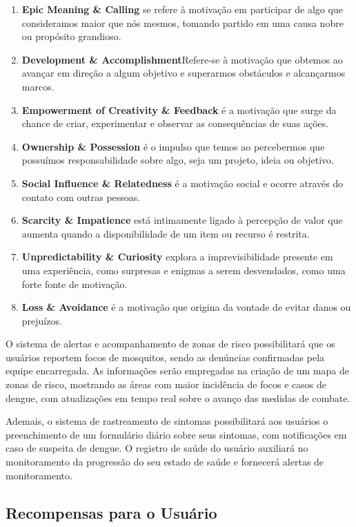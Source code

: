 \documentclass[a5paper, 12pt]{article}
\begin{document}
\begin{enumerate}
    \item \textbf{Epic Meaning \& Calling} se refere à motivação em participar de algo que consideramos maior que nós mesmos, tomando partido em uma causa nobre ou propósito grandioso.
    \item \textbf{Development \& Accomplishment}Refere-se à motivação que obtemos ao avançar em direção a algum objetivo e superarmos obstáculos e alcançarmos marcos.
    \item \textbf{Empowerment of Creativity \& Feedback} é a motivação que surge da chance de criar, experimentar e observar as consequências de suas ações.
    \item \textbf{Ownership \& Possession} é o impulso que temos ao percebermos que possuímos responsabilidade sobre algo, seja um projeto, ideia ou objetivo.
    \item \textbf{Social Influence \& Relatedness} é a motivação social e ocorre através do contato com outras pessoas.
    \item \textbf{Scarcity \& Impatience} está intimamente ligado à percepção de valor que aumenta quando a disponibilidade de um item ou recurso é restrita.
    \item \textbf{Unpredictability \& Curiosity} explora a imprevisibilidade presente em uma experiência, como surpresas e enigmas a serem desvendados, como uma forte fonte de motivação.
    \item \textbf{Loss \& Avoidance} é a motivação que origina da vontade de evitar danos ou prejuízos.
\end{enumerate}

O sistema de alertas e acompanhamento de zonas de risco possibilitará que os usuários reportem focos de mosquitos, sendo as denúncias confirmadas pela equipe encarregada. As informações serão empregadas na criação de um mapa de zonas de risco, mostrando as áreas com maior incidência de focos e casos de dengue, com atualizações em tempo real sobre o avanço das medidas de combate.

Ademais, o sistema de rastreamento de sintomas possibilitará aos usuários o preenchimento de um formulário diário sobre seus sintomas, com notificações em caso de suspeita de dengue. O registro de saúde do usuário auxiliará no monitoramento da progressão do seu estado de saúde e fornecerá alertas de monitoramento.

\subsection{Recompensas para o Usuário}
\end{document}
